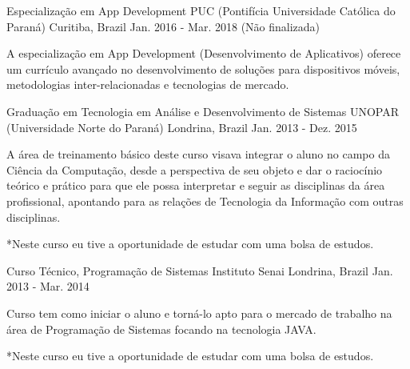 

\begin{cventries}

  \cventry
    {Especialização em App Development} %
    {PUC (Pontifícia Universidade Católica do Paraná)} %
    {Curitiba, Brazil} %
    {Jan. 2016 - Mar. 2018 (Não finalizada)} %
    {
      \begin{cvitems} %
\item {A especialização em App Development (Desenvolvimento de Aplicativos) oferece um currículo avançado no desenvolvimento de soluções para dispositivos móveis, metodologias inter-relacionadas e tecnologias de mercado.}
      \end{cvitems}
    }



  \cventry
    {Graduação em Tecnologia em Análise e Desenvolvimento de Sistemas} %
    {UNOPAR (Universidade Norte do Paraná)} %
    {Londrina, Brazil} %
    {Jan. 2013 - Dez. 2015} %
    {
      \begin{cvitems} %
\item {A área de treinamento básico deste curso visava integrar o aluno no campo da Ciência da Computação, desde a perspectiva de seu objeto e dar o raciocínio teórico e prático para que ele possa interpretar e seguir as disciplinas da área profissional, apontando para as relações de Tecnologia da Informação com outras disciplinas.}
 \item { *Neste curso eu tive a oportunidade de estudar com uma bolsa de estudos.}
      \end{cvitems}
    }
    
  \cventry
    {Curso Técnico, Programação de Sistemas} %
    {Instituto Senai} %
    {Londrina, Brazil} %
    {Jan. 2013 - Mar. 2014} %
    {
      \begin{cvitems} %
\item {Curso tem como iniciar o aluno e torná-lo apto para o mercado de trabalho na área de Programação de Sistemas focando na tecnologia JAVA.}
 \item { *Neste curso eu tive a oportunidade de estudar com uma bolsa de estudos.}
      \end{cvitems}
    }
\end{cventries}
